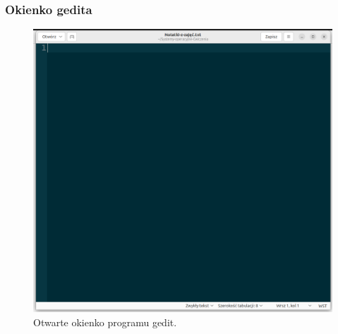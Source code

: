 \documentclass[10pt,t]{beamer}
\begin{document}
\begin{frame}
  \frametitle{Okienko gedita}


  \begin{figure}

    \centering

    \includegraphics[scale=0.18]
    {./Presentations-pictures/gedit-window.png}

    \caption{Otwarte okienko programu gedit.}


    \label{fig:Gedit-window}

  \end{figure}

\end{frame}
\end{document}
